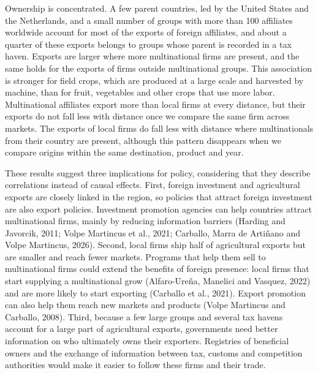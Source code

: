 \documentclass[11pt,a4paper]{article}
\begin{document}
Ownership is concentrated. A few parent countries, led by the United States and the Netherlands,
and a small number of groups with more than 100 affiliates worldwide account for most of the
exports of foreign affiliates, and about a quarter of these exports belongs to groups whose parent
is recorded in a tax haven. Exports are larger where more multinational firms are present, and the
same holds for the exports of firms outside multinational groups. This association is stronger for field crops, which are produced at a
large scale and harvested by machine, than for fruit, vegetables and other crops that use more labor. Multinational affiliates export more than local firms at every
distance, but their exports do not fall less with distance once we compare the same firm across
markets. The exports of local firms do fall less with distance where multinationals from their
country are present, although this pattern disappears when we compare origins within the same
destination, product and year.

These results suggest three implications for policy, considering that they describe correlations
instead of causal effects. First, foreign investment and agricultural exports are closely linked
in the region, so policies that attract foreign investment are also export policies. Investment
promotion agencies can help countries attract multinational firms, mainly by reducing information
barriers (Harding and Javorcik, 2011; Volpe Martincus et al., 2021; Carballo, Marra de Arti\~nano
and Volpe Martincus, 2026). Second, local firms ship half of agricultural exports but are smaller
and reach fewer markets. Programs that help them sell to multinational firms could extend the
benefits of foreign presence: local firms that start supplying a multinational grow
(Alfaro-Ure\~na, Manelici and Vasquez, 2022) and are more likely to start exporting (Carballo et
al., 2021). Export promotion can also help them reach new markets and products (Volpe Martincus
and Carballo, 2008). Third, because a few large groups and several tax havens account for a large
part of agricultural exports, governments need better information on who ultimately owns their
exporters. Registries of beneficial owners and the exchange of information between tax, customs
and competition authorities would make it easier to follow these firms and their trade.
\end{document}
